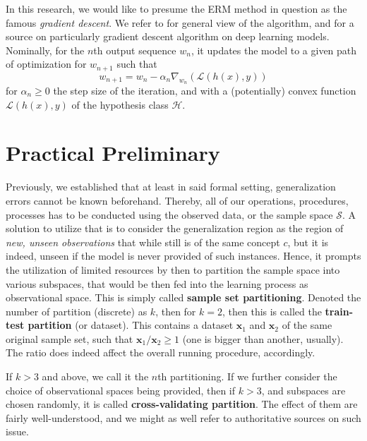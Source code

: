 \documentclass{article}
\begin{document}
In this research, we would like to presume the ERM method in question as the famous \textit{gradient descent}. We refer to \cite{achlioptas_stochastic_nodate,ruder_overview_2017} for general view of the algorithm, and \cite{zhang_gradient_2019} for a source on particularly gradient descent algorithm on deep learning models. Nominally, for the $n$th output sequence $w_{n}$, it updates the model to a given path of optimization for $w_{n+1}$ such that 
\begin{equation}
    w_{n+1} = w_{n} - \alpha_{n}\nabla_{w_{n}}(\mathcal{L}(h(x),y))
\end{equation}
for $\alpha_{n}\geq 0$ the step size of the iteration, and with a (potentially) convex function $\mathcal{L}(h(x),y)$ of the hypothesis class $\mathcal{H}$. 

\section{Practical Preliminary}

Previously, we established that at least in said formal setting, generalization errors cannot be known beforehand. Thereby, all of our operations, procedures, processes has to be conducted using the observed data, or the sample space $\mathcal{S}$. A solution to utilize that is to consider the generalization region as the region of \textit{new, unseen observations} that while still is of the same concept $c$, but it is indeed, unseen if the model is never provided of such instances. Hence, it prompts the utilization of limited resources by then to partition the sample space into various subspaces, that would be then fed into the learning process as observational space. This is simply called \textbf{sample set partitioning}. Denoted the number of partition (discrete) as $k$, then for $k=2$, then this is called the \textbf{train-test partition} (or dataset). This contains a dataset $\mathbf{x}_{1}$ and $\mathbf{x}_{2}$ of the same original sample set, such that $\mathbf{x}_{1}/\mathbf{x}_{2}\geq 1$ (one is bigger than another, usually). The ratio does indeed affect the overall running procedure, accordingly.

If $k>3$ and above, we call it the $n$th partitioning. If we further consider the choice of observational spaces being provided, then if $k>3$, and subspaces are chosen randomly, it is called \textbf{cross-validating partition}. The effect of them are fairly well-understood, and we might as well refer to authoritative sources on such issue. 
\end{document}
